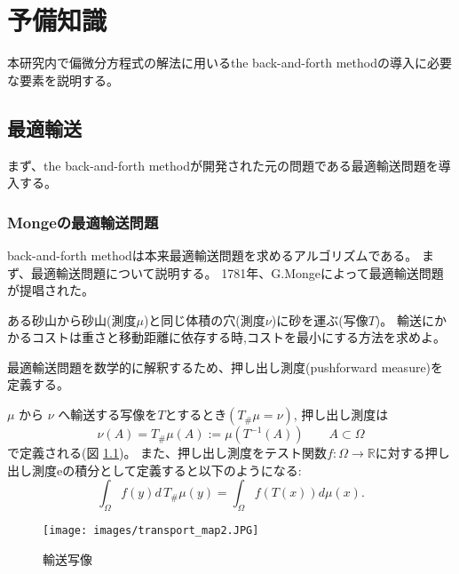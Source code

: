 \chapter{予備知識} \label{ch:background}
本研究内で偏微分方程式の解法に用いるthe back-and-forth methodの導入に必要な要素を説明する。
\section{最適輸送}
\label{sect:最適輸送}
まず、the back-and-forth methodが開発された元の問題である最適輸送問題を導入する。
\subsection{Mongeの最適輸送問題}
\label{sect:Mongeの最適輸送問題}
back-and-forth methodは本来最適輸送問題を求めるアルゴリズムである。
まず、最適輸送問題について説明する。
1781年、G.Mongeによって最適輸送問題が提唱された。

\begin{monge}
    ある砂山から砂山(測度$\mu$)と同じ体積の穴(測度$\nu$)に砂を運ぶ(写像$T$)。
    輸送にかかるコストは重さと移動距離に依存する時,コストを最小にする方法を求めよ。
\end{monge}

最適輸送問題を数学的に解釈するため、押し出し測度(pushforward measure)を定義する。
\begin{dfn}
    $\mu$ から $\nu$ へ輸送する写像を$T$とするとき$(T_\#\mu = \nu)$,
    押し出し測度は
    \begin{equation*}
        \nu (A) =  T_\#\mu (A) := \mu (T^{-1} (A)) \qquad A \subset \Omega
    \end{equation*}
    で定義される(図 \ref{fig:pushforward measure})。
    また、押し出し測度をテスト関数$f: \Omega \to \mathbb{R}$に対する押し出し測度eの積分として定義すると以下のようになる:
    \begin{equation}
        \label{def:pushforward_int}
        \int_{\Omega} f(y)d\, T_\# \mu (y) = \int_\Omega f(T(x)) d \mu(x).
      \end{equation}
\end{dfn}

\begin{figure}[htbp]
    \begin{center}
        \texttt{[image: images/transport\_map2.JPG]}
        \caption{輸送写像}
        \label{fig:pushforward measure}
    \end{center}
\end{figure}


